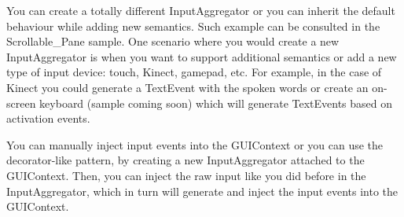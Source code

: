 You can create a totally different Input\+Aggregator or you can inherit the default behaviour while adding new semantics. Such example can be consulted in the Scrollable\+\_\+\+Pane sample. One scenario where you would create a new Input\+Aggregator is when you want to support additional semantics or add a new type of input device\+: touch, Kinect, gamepad, etc. For example, in the case of Kinect you could generate a Text\+Event with the spoken words or create an on-\/screen keyboard (sample coming soon) which will generate Text\+Events based on activation events.

You can manually inject input events into the G\+U\+I\+Context or you can use the decorator-\/like pattern, by creating a new Input\+Aggregator attached to the G\+U\+I\+Context. Then, you can inject the raw input like you did before in the Input\+Aggregator, which in turn will generate and inject the input events into the G\+U\+I\+Context.

